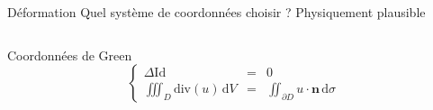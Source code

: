 \documentclass{beamer}
\begin{document}
\begin{frame}{Déformation}
Quel système de coordonnées choisir ? Physiquement plausible
\begin{columns}
	\begin{column}{.8\textwidth}

\begin{block}{Coordonnées de Green}
\begin{equation}
\left\lbrace
\begin{array}{lcr}
\Delta \mathrm{Id} &=& 0 \\
\iiint_D \mathrm{div} \left( u \right)\,\mathrm{d}V &=& \iint_{\partial D} u \cdot \mathbf{n}\,\mathrm{d}\sigma
\end{array}
\right.
\end{equation}
\end{block}


\end{column}
\end{columns}
\end{frame}
\end{document}
